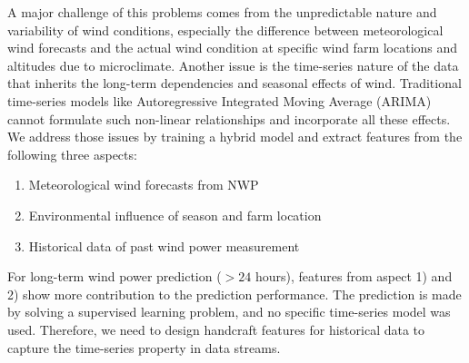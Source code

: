 \documentclass[conference]{IEEEtran}
\begin{document}
A major challenge of this problems comes from the unpredictable nature and variability of wind conditions, especially the difference between meteorological wind forecasts and the actual wind condition at specific wind farm locations and altitudes due to microclimate. Another issue is the time-series nature of the data that inherits the long-term dependencies and seasonal effects of wind. Traditional time-series models like Autoregressive Integrated Moving Average (ARIMA) cannot formulate such non-linear relationships and incorporate all these effects. We address those issues by training a hybrid model and extract features from the following three aspects:
\begin{enumerate}
\item Meteorological wind forecasts from NWP
\item Environmental influence of season and farm location
\item Historical data of past wind power measurement
\end{enumerate}

For long-term wind power prediction ($> 24$ hours), features from aspect 1) and 2) show more contribution to the prediction performance. The prediction is made by solving a supervised learning problem, and no specific time-series model was used. Therefore, we need to design handcraft features for historical data to capture the time-series property in data streams.
\end{document}
